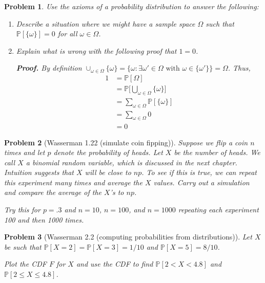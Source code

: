 \documentclass{article}
\newtheorem{problem}{Problem}
\newcommand{\PP}{\mathbb{P}}
\begin{document}
\begin{problem}
    Use the axioms of a probability distribution to answer the following:
    \begin{enumerate}[label=(\alph*),topsep=0pt]
        \item Describe a situation where we might have a sample space $\Omega$ such that $\PP[\{\omega\}] = 0$ for all $\omega\in\Omega$.
        \item 
            Explain what is wrong with the following proof that $1=0$.
            
            \textbf{Proof.} By definition $\cup_{\omega \in \Omega} \{\omega\} = \{ \omega : \exists \omega' \in \Omega \text{ with } \omega \in \{\omega' \} \} = \Omega$.
            Thus,
            \begin{align*}
                1 &= \PP[\Omega] \tag{Axiom 2}
                \\&= \PP\bigg[\bigcup_{\omega \in \Omega} \{ \omega\}\bigg]  \tag{definition of union}
                \\&= \sum_{\omega \in \Omega} \PP[\{\omega\} ] \tag{Axiom 3} 
                \\&= \sum_{\omega \in \Omega} 0  \tag{assumption} 
                \\&= 0 \tag*{\qed}
            \end{align*}
    \end{enumerate}
\end{problem}

\begin{problem}[Wasserman 1.22 (simulate coin fipping)]
Suppose we flip a coin $n$ times and let $p$ denote
the probability of heads. Let $X$ be the number of heads. We call $X$
a binomial random variable, which is discussed in the next chapter.
Intuition suggests that $X$ will be close to $np$. To see if this is true, we
can repeat this experiment many times and average the $X$ values. Carry
out a simulation and compare the average of the $X$'s to $np$. 

Try this for
$p =.3$ and $n = 10$, $n = 100$, and $n = 1000$ repeating each experiment 100 and then 1000 times.
\end{problem}

\begin{problem}[Wasserman 2.2 (computing probabilities from distributions)]
    Let $X$ be such that $\PP[X=2] = \PP[X=3] = 1/10$ and $\PP[X=5] = 8/10$.

    Plot the CDF $F$ for $X$ and use the CDF to find $\PP[2<X<4.8]$ and $\PP[2\leq X\leq 4.8]$.

\end{problem}
\end{document}
